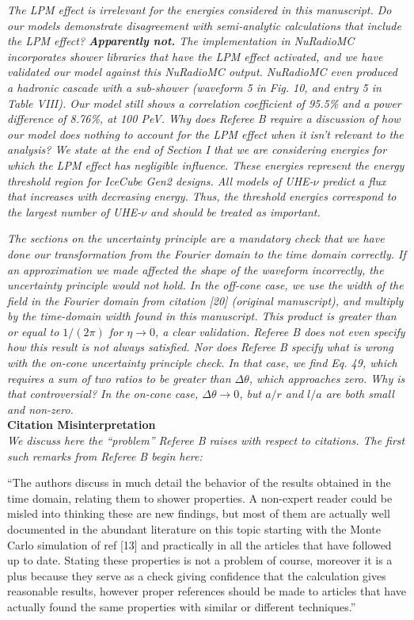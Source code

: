 \documentclass[12pt]{article}
\begin{document}
\textit{The LPM effect is irrelevant for the energies considered in this manuscript.  Do our models demonstrate disagreement with semi-analytic calculations that include the LPM effect?  \textbf{Apparently not.}  The implementation in NuRadioMC incorporates shower libraries that have the LPM effect activated, and we have validated our model against this NuRadioMC output.  NuRadioMC even produced a hadronic cascade with a sub-shower (waveform 5 in Fig. 10, and entry 5 in Table VIII).  Our model still shows a correlation coefficient of 95.5\% and a power difference of 8.76\%, at 100 PeV.  Why does Referee B require a discussion of how our model does nothing to account for the LPM effect when it isn't relevant to the analysis?  We state at the end of Section I that we are considering energies for which the LPM effect has negligible influence.  These energies represent the energy threshold region for IceCube Gen2 designs.  All models of UHE-$\nu$ predict a flux that increases with decreasing energy.  Thus, the threshold energies correspond to the largest number of UHE-$\nu$ and should be treated as important.}

\textit{The sections on the uncertainty principle are a mandatory check that we have done our transformation from the Fourier domain to the time domain correctly.  If an approximation we made affected the shape of the waveform incorrectly, the uncertainty principle would not hold.  In the off-cone case, we use the width of the field in the Fourier domain from citation [20] (original manuscript), and multiply by the time-domain width found in this manuscript.  This product is greater than or equal to $1/(2\pi)$ for $\eta \to 0$, a clear validation.  Referee B does not even specify how this result is not always satisfied.  Nor does Referee B specify what is wrong with the on-cone uncertainty principle check.  In that case, we find Eq. 49, which requires a sum of two ratios to be greater than $\Delta\theta$, which approaches zero.  Why is that controversial?  In the on-cone case, $\Delta\theta \to 0$, but $a/r$ and $l/a$ are both small and non-zero.} \\

\textbf{Citation Misinterpretation} \\

\textit{We discuss here the ``problem'' Referee B raises with respect to citations.  The first such remarks from Referee B begin here:}

``The authors discuss in much detail the behavior of the results obtained in the time domain, relating them to shower properties. A non-expert reader could be misled into thinking these are new findings, but most of them are actually well documented in the abundant literature on this topic starting with the Monte Carlo simulation of ref [13] and practically in all the articles that have followed up to date. Stating these properties is not a problem of course, moreover it is a plus because they serve as a check giving confidence that the calculation gives reasonable results, however proper references should be made to articles that have actually found the same properties with similar or different techniques.''
\end{document}

